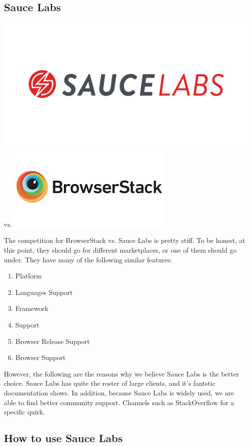\subsection{ Sauce Labs }
\includegraphics[scale=0.25]{pwa-toolset-sauce-labs/logo-sauce-labs}
vs.
\includegraphics[scale=0.4]{pwa-toolset-sauce-labs/logo-browserstack}

The competition for BrowserStack vs. Sauce Labs is pretty stiff. To be honest,
at this point, they should go for different marketplaces, or one of them should
go under. They have many of the following similar features:
\begin{enumerate}
  \item Platform
  \item Languages Support
  \item Framework
  \item Support
  \item Browser Release Support
  \item Browser Support
\end{enumerate}

However, the following are the reasons why we believe Sauce Labs is the better
choice. Sauce Labs has quite the roster of large clients, and it's fantstic
documentation shows. In addition, because Sauce Labs is widely used, we are able
to find better community support. Channels such as StackOverflow for a specific
quirk.

\subsection{ How to use Sauce Labs }
